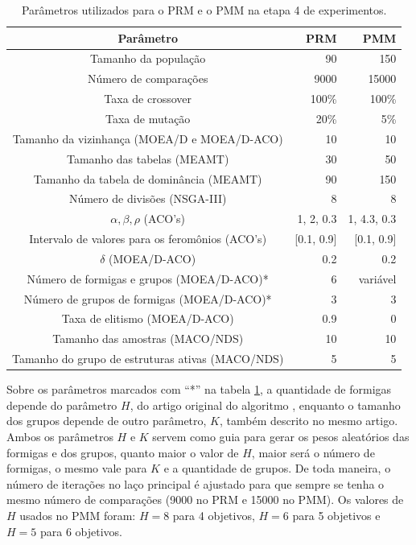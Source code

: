 \begin{table}[!htbp]
	\caption{Parâmetros utilizados para o PRM e o PMM na etapa 4 de experimentos.}
	\label{table_exp4_params}
	\begin{center}
		\begin{tabular}{c|r|r}
			\textbf{Parâmetro} & \textbf{PRM} &  \textbf{PMM} \\ %
			\hline
			Tamanho da população               &    90 &      150 \\ %
			Número de comparações        &   9000 &      15000 \\ %
			Taxa de crossover                & 100\% &    100\% \\ %
			Taxa de mutação                 &  20\% &      5\% \\ %
			Tamanho da vizinhança (MOEA/D e MOEA/D-ACO)    &    10 &       10 \\ %
			Tamanho das tabelas (MEAMT)   &    30 &       50 \\ %
			Tamanho da tabela de dominância (MEAMT) &    90 &      150 \\ %
			Número de divisões (NSGA-III)&     8 &        8 \\ %
			$\alpha, \beta, \rho$ (ACO's)& 1, 2, 0.3 & 1, 4.3, 0.3 \\ %
			Intervalo de valores para os feromônios (ACO's)& [0.1, 0.9] & [0.1, 0.9] \\ %
			$\delta$ (MOEA/D-ACO)& 0.2 & 0.2 \\ %
			Número de formigas e grupos (MOEA/D-ACO)*& 6 & variável \\ %
			Número de grupos de formigas (MOEA/D-ACO)*& 3 & 3 \\ %
			Taxa de elitismo (MOEA/D-ACO)& 0.9 & 0 \\ %
			Tamanho das amostras (MACO/NDS)& 10 & 10 \\  %
			Tamanho do grupo de estruturas ativas (MACO/NDS)& 5 & 5 \\
			\hline
		\end{tabular}
	\end{center}
\end{table}

Sobre os parâmetros marcados com ``*'' na tabela \ref{table_exp4_params}, a quantidade de formigas depende do parâmetro $H$, do artigo original do algoritmo \cite{Ke2013}, enquanto o tamanho dos grupos depende de outro parâmetro, $K$, também descrito no mesmo artigo. Ambos os parâmetros $H$ e $K$ servem como guia para gerar os pesos aleatórios das formigas e dos grupos, quanto maior o valor de $H$, maior será o número de formigas, o mesmo vale para $K$ e a quantidade de grupos. De toda maneira, o número de iterações no laço principal é ajustado para que sempre se tenha o mesmo número de comparações (9000 no PRM e 15000 no PMM). Os valores de $H$ usados no PMM foram: $H=8$ para 4 objetivos, $H=6$ para 5 objetivos e $H=5$ para 6 objetivos.

